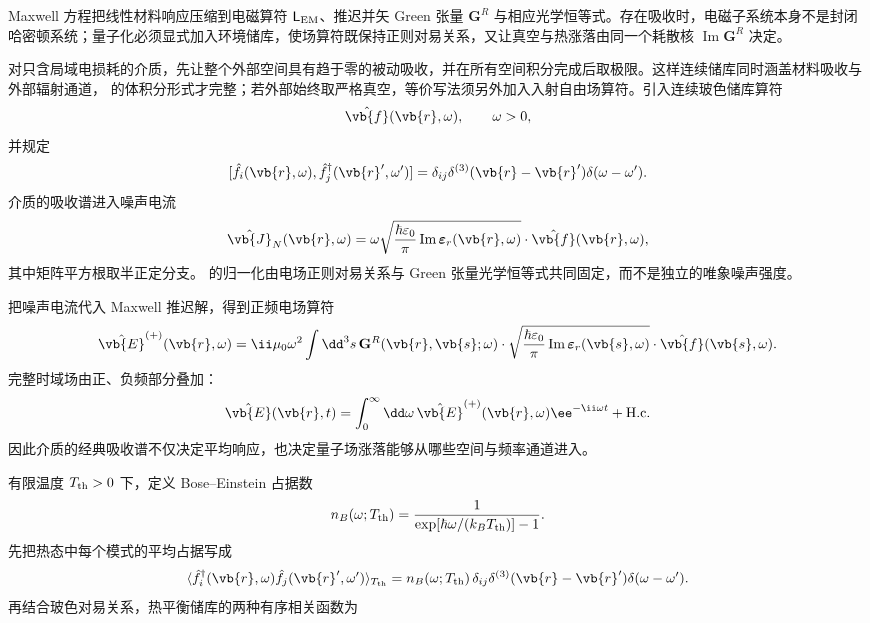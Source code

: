 
Maxwell 方程把线性材料响应压缩到电磁算符 \(\mathsf L_{\rm EM}\)、推迟并矢 Green 张量 \(\mathbf G^R\) 与相应光学恒等式。存在吸收时，电磁子系统本身不是封闭哈密顿系统；量子化必须显式加入环境储库，使场算符既保持正则对易关系，又让真空与热涨落由同一个耗散核 \(\operatorname{Im}\mathbf G^R\) 决定。

对只含局域电损耗的介质，先让整个外部空间具有趋于零的被动吸收，并在所有空间积分完成后取极限。这样连续储库同时涵盖材料吸收与外部辐射通道， 的体积分形式才完整；若外部始终取严格真空，等价写法须另外加入入射自由场算符。引入连续玻色储库算符
\begin{equation*}
 \hat{\vb{f}}(\vb{r},\omega),
 \qquad \omega>0,
\end{equation*}
并规定
\begin{equation}
 {
 [\hat f_i(\vb{r},\omega),
 \hat f_j^\dagger(\vb{r}',\omega')]
 =\delta_{ij}\delta^{(3)}(\vb{r}-\vb{r}')\delta(\omega-\omega').}
 \label{eq:reservoir-comm-SI-r12}
\end{equation}
介质的吸收谱进入噪声电流
\begin{equation}
 {
 \hat{\vb{J}}_{N}(\vb{r},\omega)
 =\omega
 \sqrt{\frac{\hbar\varepsilon_0}{\pi}
 \operatorname{Im}\boldsymbol\varepsilon_r(\vb{r},\omega)}
 \cdot\hat{\vb{f}}(\vb{r},\omega),}
 \label{eq:noise-current-SI-r12}
\end{equation}
其中矩阵平方根取半正定分支。 的归一化由电场正则对易关系与 Green 张量光学恒等式共同固定，而不是独立的唯象噪声强度。


把噪声电流代入 Maxwell 推迟解，得到正频电场算符
\begin{equation}
 {
 \hat{\vb{E}}^{(+)}(\vb{r},\omega)
 =\ii\mu_0\omega^2
 \int\dd^3 s\,
 \mathbf G^R(\vb{r},\vb{s};\omega)
 \cdot
 \sqrt{\frac{\hbar\varepsilon_0}{\pi}
 \operatorname{Im}\boldsymbol\varepsilon_r(\vb{s},\omega)}
 \cdot\hat{\vb{f}}(\vb{s},\omega).}
 \label{eq:macqed-Eplus-SI-r12}
\end{equation}
完整时域场由正、负频部分叠加：
\begin{equation*}
 \hat{\vb{E}}(\vb{r},t)
 =\int_0^\infty\dd\omega\,
 \hat{\vb{E}}^{(+)}(\vb{r},\omega)\ee^{-\ii\omega t}
 +\mathrm{H.c.}
\end{equation*}
因此介质的经典吸收谱不仅决定平均响应，也决定量子场涨落能够从哪些空间与频率通道进入。

有限温度 \(T_{\rm th}>0\) 下，定义 Bose--Einstein 占据数
\begin{equation*}
 n_B(\omega;T_{\rm th})
 =\frac1{\exp[\hbar\omega/(k_BT_{\rm th})]-1}.
\end{equation*}
先把热态中每个模式的平均占据写成
\begin{equation}
{
 \langle\hat f_i^\dagger(\vb{r},\omega)
 \hat f_j(\vb{r}',\omega')\rangle_{T_{\rm th}}
 =n_B(\omega;T_{\rm th})\,
 \delta_{ij}\delta^{(3)}(\vb{r}-\vb{r}')\delta(\omega-\omega').}
\label{eq:reservoir-thermal-occupation-dp68}
\end{equation}
再结合玻色对易关系，热平衡储库的两种有序相关函数为


